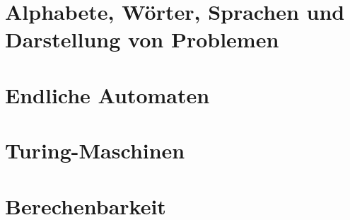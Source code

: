 \documentclass{article}
\begin{document}
\newpage





\newsection
\section{Alphabete, Wörter, Sprachen und Darstellung von Problemen}





\newsection
\section{Endliche Automaten}





\newsection
\section{Turing-Maschinen}
\setcounter{subsection}{2}




\newsection
\section{Berechenbarkeit}

\end{document}
